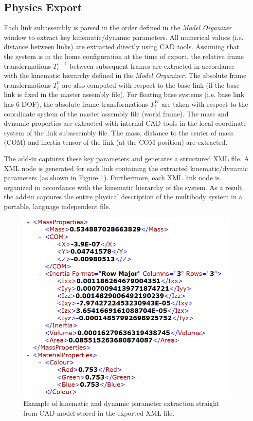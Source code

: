 \subsection{Physics Export} %
\label{sub:physics_export}
Each link subassembly is parsed in the order defined in the \emph{Model Organizer} window to extract key kinematic/dynamic parameters. All numerical values (i.e. distance between links) are extracted directly using CAD tools. Assuming that the system is in the home configuration at the time of export, the relative frame transformations $T^{i-1}_{i}$  between subsequent frames are extracted in accordance with the kinematic hierarchy defined in the \emph{Model Organizer}. The absolute frame transformations $T^{0}_{i}$ are also computed with respect to the base link (if the base link is fixed in the master assembly file). For floating base systems (i.e. base link has 6 DOF), the absolute frame transformations $T^{W}_{i}$ are taken with respect to the coordinate system of the master assembly file (world frame). The mass and dynamic properties are extracted with internal CAD tools in the local coordinate system of the link subassembly file. The mass, distance to the center of mass (COM) and inertia tensor of the link (at the COM position) are extracted.

The add-in captures these key parameters and generates a structured XML file. A XML node is generated for each link containing the extracted kinematic/dynamic parameters (as shown in Figure \ref{fig:exportfile}). Furthermore, each XML link node is organized in accordance with the kinematic hierarchy of the system. As a result, the add-in captures the entire physical description of the multibody system in a portable, language independent file.

\begin{figure}[!h]
	\centering
    \includegraphics[scale=0.6]{fig/ch3/exportfile.png}
  	\caption{Example of kinematic and dynamic parameter extraction straight from CAD model stored in the exported XML file.}
	\label{fig:exportfile}
\end{figure}


